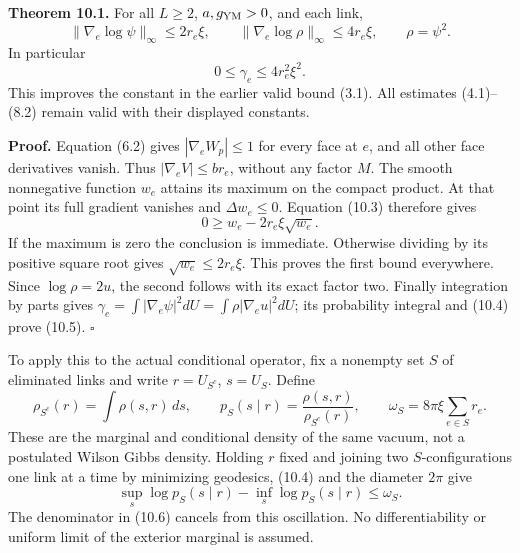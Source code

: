 \documentclass[
]{article}
\begin{document}
\textbf{Theorem 10.1.} For all \(L\ge2\), \(a,g_{\rm YM}>0\), and each
link, \[
\|\nabla_e\log\psi\|_\infty\le2r_e\xi,\qquad
\|\nabla_e\log\rho\|_\infty\le4r_e\xi,\qquad \rho=\psi^2.        \tag{10.4}
\] In particular \[
0\le\gamma_e\le4r_e^2\xi^2.                                   \tag{10.5}
\] This improves the constant in the earlier valid bound (3.1). All
estimates (4.1)--(8.2) remain valid with their displayed constants.

\textbf{Proof.} Equation (6.2) gives \(|\nabla_eW_p|\le1\) for every
face at \(e\), and all other face derivatives vanish. Thus
\(|\nabla_eV|\le br_e\), without any factor \(M\). The smooth
nonnegative function \(w_e\) attains its maximum on the compact product.
At that point its full gradient vanishes and \(\Delta w_e\le0\).
Equation (10.3) therefore gives \[
0\ge w_e-2r_e\xi\sqrt{w_e}.
\] If the maximum is zero the conclusion is immediate. Otherwise
dividing by its positive square root gives \(\sqrt{w_e}\le2r_e\xi\).
This proves the first bound everywhere. Since \(\log\rho=2u\), the
second follows with its exact factor two. Finally integration by parts
gives \(\gamma_e=\int|\nabla_e\psi|^2dU=\int\rho|\nabla_eu|^2dU\); its
probability integral and (10.4) prove (10.5). \(\square\)

To apply this to the actual conditional operator, fix a nonempty set
\(S\) of eliminated links and write \(r=U_{S^c}\), \(s=U_S\). Define \[
\rho_{S^c}(r)=\int\rho(s,r)\,ds,\qquad
p_S(s\mid r)=\frac{\rho(s,r)}{\rho_{S^c}(r)},\qquad
\omega_S=8\pi\xi\sum_{e\in S}r_e.                              \tag{10.6}
\] These are the marginal and conditional density of the same vacuum,
not a postulated Wilson Gibbs density. Holding \(r\) fixed and joining
two \(S\)-configurations one link at a time by minimizing geodesics,
(10.4) and the diameter \(2\pi\) give \[
\sup_s\log p_S(s\mid r)-\inf_s\log p_S(s\mid r)\le\omega_S.      \tag{10.7}
\] The denominator in (10.6) cancels from this oscillation. No
differentiability or uniform limit of the exterior marginal is assumed.
\end{document}
